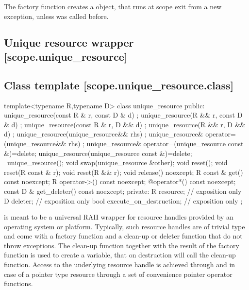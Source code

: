 \documentclass[ebook,11pt,article]{memoir}
\begin{document}
\begin{itemdescr}
\pnum
The factory function creates a  object, that runs  at scope exit from a new exception, unless  was called before.

\end{itemdescr}




\subsection{Unique resource wrapper [scope.unique_resource]}

\subsection {Class template  [scope.unique_resource.class]}

\begin{codeblock}
template<typename R,typename D>
class unique_resource {
public:
  unique_resource(const R & r, const D & d) ;
  unique_resource(R && r, const D & d) ;
  unique_resource(const R & r, D && d) ;
  unique_resource(R && r, D && d) ;
  unique_resource(unique_resource&& rhs) ;
  unique_resource& operator=(unique_resource&& rhs) ;
  unique_resource& operator=(unique_resource const &)=delete;
  unique_resource(unique_resource const &)=delete; 
  ~unique_resource();
  void swap(unique_resource &other);
  void reset();
  void reset(R const & r);
  void reset(R && r);
  void release() noexcept;
  R const & get() const noexcept;
  R operator->() const noexcept;
  @\seebelow@ operator*() const noexcept;
  const D & get_deleter() const noexcept;
private:
  R resource; // exposition only
  D deleter; // exposition only
  bool execute_on_destruction; // exposition only
};
\end{codeblock}

\pnum
\enternote
{} is meant to be a universal RAII wrapper for resource handles provided by an operating system or platform.
Typically, such resource handles are of trivial type and come with a factory function and a clean-up or deleter function that do not throw exceptions.
The clean-up function together with the result of the factory function is used to create a  variable, that on destruction will call the clean-up function. Access to the underlying resource handle is achieved through  and in case of a pointer type resource through a set of convenience pointer operator functions.
\exitnote
\end{document}
